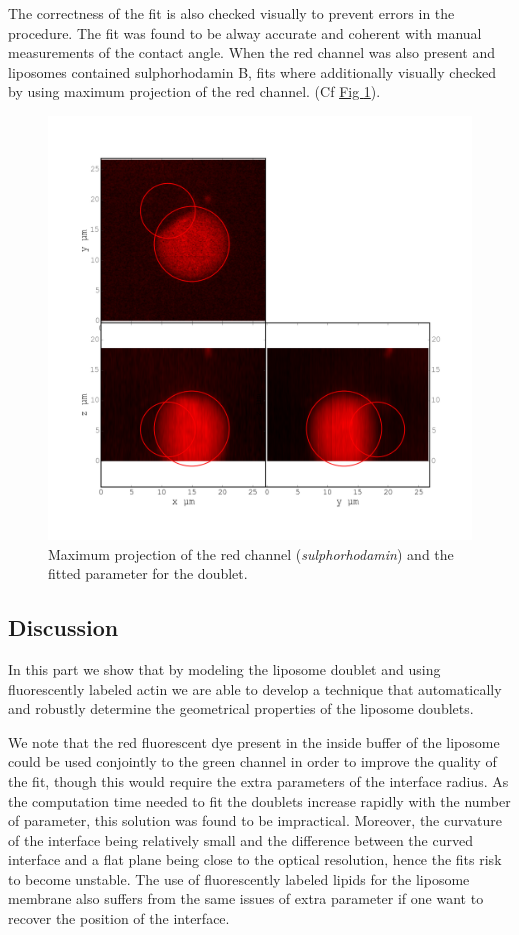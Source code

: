 \documentclass[A4paperpaper,11pt,english]{sphinxmanual}
\begin{document}
The correctness of the fit is also checked visually to prevent errors in the
procedure.  The fit was found to be alway accurate and coherent with manual
measurements of the contact angle.  When the red channel was also present and liposomes
contained sulphorhodamin B, fits where additionally visually checked by using maximum
projection of the red channel.  (Cf \hyperref[index-latex:srhod]{Fig  \ref*{index-latex:srhod}}).
\begin{figure}[htbp]
\centering
\capstart

\includegraphics[width=0.800\linewidth]{srhod_superimpose.png}
\caption{Maximum projection of the red channel (\emph{sulphorhodamin}) and the fitted
parameter for the doublet.}\label{index-latex:srhod}\end{figure}


\subsection{Discussion}
\label{index-latex:id24}
In this part we show that by modeling the liposome doublet and using
fluorescently labeled actin we are able to develop a technique that
automatically and robustly determine the geometrical properties of the liposome
doublets.

We note that the red fluorescent dye present in the inside buffer of the
liposome could be used conjointly to the green channel in order to improve the
quality of the fit, though this would require the extra parameters of the
interface radius. As the computation time needed to fit the doublets increase
rapidly with the number of parameter, this solution was found to be
impractical.  Moreover, the curvature of the interface being relatively small
and the difference between the curved interface and a flat plane being close to
the optical resolution, hence the fits risk to become unstable.  The use of
fluorescently labeled lipids for the liposome membrane also suffers from the
same issues of extra parameter if one want to recover the position of the
interface.
\end{document}
